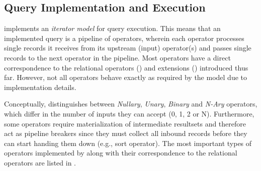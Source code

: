 \subsection{Query Implementation and Execution}

\cottontail{} implements an \emph{iterator model} for query execution. This means that an implemented query is a pipeline of operators, wherein each operator processes single records it receives from its upstream (input) operator(s) and passes single records to the next operator in the pipeline. Most operators have a direct correspondence to the relational operators () and extensions () introduced thus far. However, not all operators behave exactly as required by the model due to implementation details. 

Conceptually, \cottontail{} distinguishes between \emph{Nullary}, \emph{Unary}, \emph{Binary} and \emph{N-Ary} operators, which differ in the number of inputs they can accept (0, 1, 2 or N). Furthermore, some operators require materialization of intermediate resultsets and therefore act as pipeline breakers since they must collect all inbound records before they can start handing them down (e.g., sort operator). The most important types of operators implemented by \cottontail{} along with their correspondence to the relational operators are listed in .

